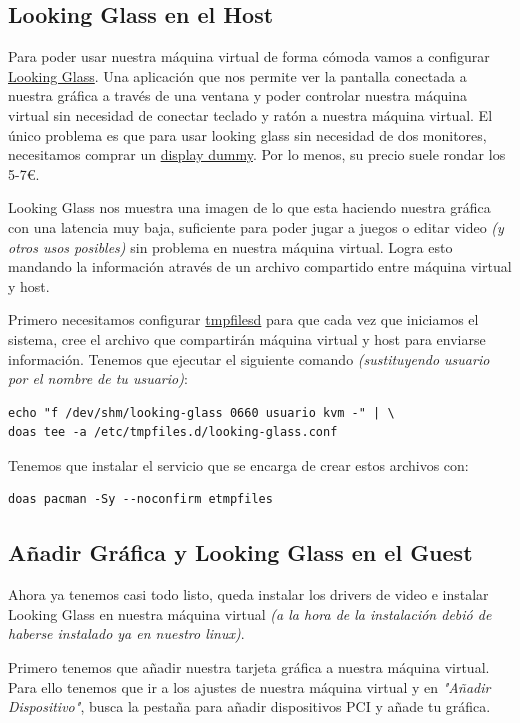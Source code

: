 \documentclass[12pt]{article}
\begin{document}
\subsection{Looking Glass en el Host}

Para poder usar nuestra máquina virtual de forma cómoda vamos a configurar \href{https://looking-glass.io/}{Looking Glass}. Una aplicación que nos permite ver la pantalla conectada a nuestra gráfica a través de una ventana y poder controlar nuestra máquina virtual sin necesidad de conectar teclado y ratón a nuestra máquina virtual. El único problema es que para usar looking glass sin necesidad de dos monitores, necesitamos comprar un \href{https://www.amazon.com/s?k=display+dummy}{display dummy}. Por lo menos, su precio suele rondar los 5-7€.

Looking Glass nos muestra una imagen de lo que esta haciendo nuestra gráfica con una latencia muy baja, suficiente para poder jugar a juegos o editar video \emph{(y otros usos posibles)} sin problema en nuestra máquina virtual. Logra esto mandando la información através de un archivo compartido entre máquina virtual y host.

Primero necesitamos configurar \href{dsada}{tmpfilesd} para que cada vez que iniciamos el sistema, cree el archivo que compartirán máquina virtual y host para enviarse información. Tenemos que ejecutar el siguiente comando \emph{(sustituyendo usuario por el nombre de tu usuario)}:

\begin{verbatim}
echo "f /dev/shm/looking-glass 0660 usuario kvm -" | \
doas tee -a /etc/tmpfiles.d/looking-glass.conf
\end{verbatim}

Tenemos que instalar el servicio que se encarga de crear estos archivos con:

\begin{verbatim}
doas pacman -Sy --noconfirm etmpfiles
\end{verbatim}

\subsection{Añadir Gráfica y Looking Glass en el Guest}

Ahora ya tenemos casi todo listo, queda instalar los drivers de video e instalar Looking Glass en nuestra máquina virtual \emph{(a la hora de la instalación debió de haberse instalado ya en nuestro linux)}.

Primero tenemos que añadir nuestra tarjeta gráfica a nuestra máquina virtual. Para ello tenemos que ir a los ajustes de nuestra máquina virtual y en \emph{"Añadir Dispositivo"}, busca la pestaña para añadir dispositivos PCI y añade tu gráfica.
\end{document}
